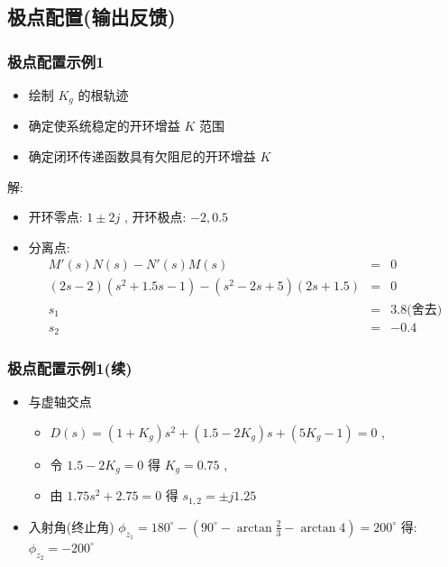 \documentclass{article}
\begin{document}
\subsection{极点配置(输出反馈)}
\label{sec-4-2}
\begin{frame}
\frametitle{极点配置示例1}
\label{sec-4-2-1}


\begin{itemize}
\item 绘制 $K_g$ 的根轨迹
\item 确定使系统稳定的开环增益 $K$ 范围
\item 确定闭环传递函数具有欠阻尼的开环增益 $K$
\end{itemize}
解:
\begin{itemize}
\item <2->开环零点: $1\pm 2j$ , 开环极点: $-2,0.5$
\item <3->分离点: 
      \begin{eqnarray*}
      M'(s)N(s)-N'(s)M(s)  & = & 0 \\
      (2s-2)(s^2+1.5s-1)-(s^2-2s+5)(2s+1.5) &=& 0 \\
       s_1 &=& 3.8 \text{(舍去)} \\
       s_2 &=& -0.4 
      \end{eqnarray*}
\end{itemize}
\end{frame}
\begin{frame}
\frametitle{极点配置示例1(续)}
\label{sec-4-2-2}

\begin{itemize}
\item <2->与虚轴交点
\begin{itemize}
\item $D(s)=(1+K_g)s^2+(1.5-2K_g)s+(5K_g-1)=0$ ,
\item 令 $1.5-2K_g=0$ 得 $K_g=0.75$ ,
\item 由 $1.75s^2+2.75=0$ 得 $s_{1,2}=\pm j 1.25$
\end{itemize}
\item <3->入射角(终止角) $\phi_{z_1}=180^{\circ}-(90^{\circ}-\arctan\frac{2}{3}-\arctan4)=200^{\circ}$ 得: $\phi_{z_2}=-200^{\circ}$
\end{itemize}
\end{frame}
\end{document}
